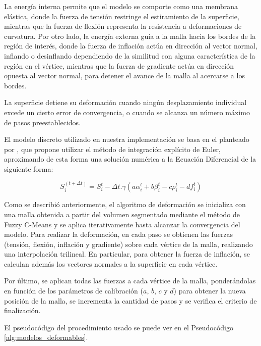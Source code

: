 La energía interna permite que el modelo se comporte como una membrana elástica, donde la fuerza de tensión restringe el estiramiento de la superficie, mientras que la fuerza de flexión representa la resistencia a deformaciones de curvatura. Por otro lado, la energía externa guía a la malla hacia los bordes de la región de interés, donde la fuerza de inflación actúa en dirección al vector normal, inflando o desinflando dependiendo de la similitud con alguna característica de la región en el vértice, mientras que la fuerza de gradiente actúa en dirección opuesta al vector normal, para detener el avance de la malla al acercarse a los bordes. 

La superficie detiene su deformación cuando ningún desplazamiento individual excede un cierto error de convergencia, o cuando se alcanza un número máximo de pasos preestablecidos.

El modelo discreto utilizado en nuestra implementación se basa en el planteado por \citep{mcinerney2000t}, que propone utilizar el método de integración explícito de Euler, aproximando de esta forma una solución numérica a la Ecuación Diferencial de la siguiente forma:

$$ S^{(t+\Delta t)}_{i} = S_{i}^{t} - \Delta t.\gamma(a\alpha_{i}^{t} + b\beta_{i}^{t} - c\rho_{i}^{t} - df_{i}^{t}) $$

Como se describió anteriormente, el algoritmo de deformación se inicializa con una malla obtenida a partir del volumen segmentado mediante el método de Fuzzy C-Means y se aplica iterativamente hasta alcanzar la convergencia del modelo. Para realizar la deformación, en cada paso se obtienen las fuerzas (tensión, flexión, inflación y gradiente) sobre cada vértice de la malla, realizando una interpolación trilineal. En particular, para obtener la fuerza de inflación, se calculan además los vectores normales a la superficie en cada vértice. 

Por último, se aplican todas las fuerzas a cada vértice de la malla, ponderándolas en función de los parámetros de calibración ($a$, $b$, $c$ y $d$) para obtener la nueva posición de la malla, se incrementa la cantidad de pasos y se verifica el criterio de finalización.

El pseudocódigo del procedimiento usado se puede ver en el Pseudocódigo \ref{alg:modelos_deformables}.

